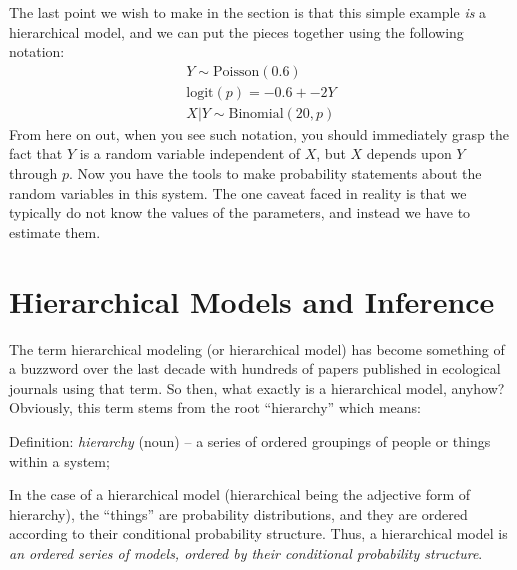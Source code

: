 The last point we wish
to make in the section is that this simple example \textit{is}
a hierarchical model, and we can put the pieces together using
the following notation:
\begin{gather}
  Y \sim \text{Poisson}(0.6) \\
  \text{logit}(p) = -0.6 + -2Y \\
  X|Y \sim \text{Binomial}(20, p)
\end{gather}
From here on out, when you see such notation, you should immediately
grasp the fact that $Y$ is a random variable independent of $X$, but
$X$ depends upon $Y$ through $p$. Now you have the tools to make
probability statements about the random variables in this system. The
one caveat faced in reality is that we typically do not know the
values of the parameters, and instead we have to estimate them. %



\section{Hierarchical Models and Inference}

The term hierarchical modeling (or hierarchical model) has become
something of a buzzword over the last decade with hundreds of papers
published in ecological journals using that term.  So then, what
exactly is a hierarchical model, anyhow? Obviously, this term stems
from the root ``hierarchy'' which means:

\vspace{.1in}

{\flushleft
Definition: {\it hierarchy} (noun) -- a series of ordered groupings of people or things within a system;
}

\vspace{.1in}

In the case of a hierarchical model (hierarchical being the adjective
form of hierarchy), the ``things'' are probability distributions, and
they are ordered according to their conditional probability structure.
Thus, a hierarchical model is {\it an ordered series of models,
  ordered by their conditional probability structure}.

